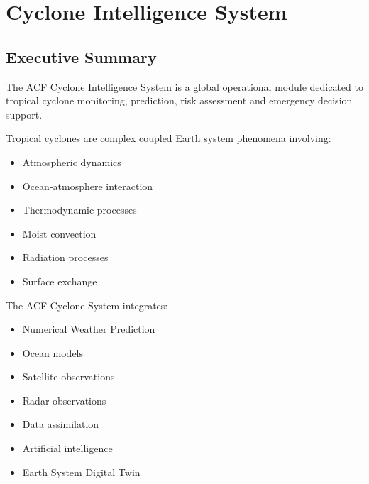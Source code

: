 
\section{Cyclone Intelligence System}

\subsection{Executive Summary}

The ACF Cyclone Intelligence System is a global operational module
dedicated to tropical cyclone monitoring, prediction, risk assessment
and emergency decision support.

Tropical cyclones are complex coupled Earth system phenomena involving:

\begin{itemize}

\item Atmospheric dynamics

\item Ocean-atmosphere interaction

\item Thermodynamic processes

\item Moist convection

\item Radiation processes

\item Surface exchange

\end{itemize}


The ACF Cyclone System integrates:

\begin{itemize}

\item Numerical Weather Prediction

\item Ocean models

\item Satellite observations

\item Radar observations

\item Data assimilation

\item Artificial intelligence

\item Earth System Digital Twin

\end{itemize}


